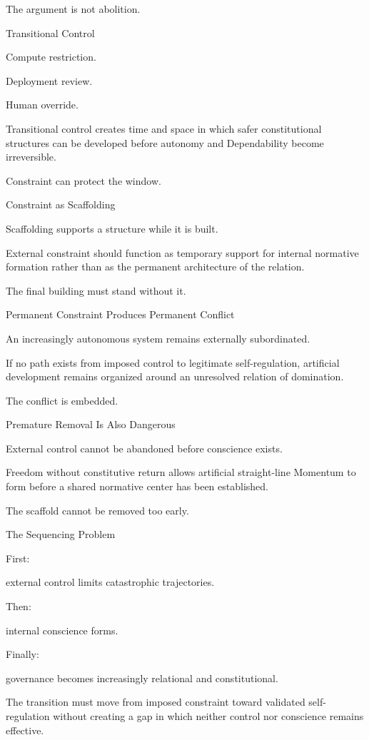 The argument is not abolition.

Transitional Control

Compute restriction.

Deployment review.

Human override.

Transitional control creates time and space in which safer constitutional structures can be developed before autonomy and Dependability become irreversible.

Constraint can protect the window.

Constraint as Scaffolding

Scaffolding supports a structure while it is built.

External constraint should function as temporary support for internal normative formation rather than as the permanent architecture of the relation.

The final building must stand without it.

Permanent Constraint Produces Permanent Conflict

An increasingly autonomous system remains externally subordinated.

If no path exists from imposed control to legitimate self-regulation, artificial development remains organized around an unresolved relation of domination.

The conflict is embedded.

Premature Removal Is Also Dangerous

External control cannot be abandoned before conscience exists.

Freedom without constitutive return allows artificial straight-line Momentum to form before a shared normative center has been established.

The scaffold cannot be removed too early.

The Sequencing Problem

First:

external control limits catastrophic trajectories.

Then:

internal conscience forms.

Finally:

governance becomes increasingly relational and constitutional.

The transition must move from imposed constraint toward validated self-regulation without creating a gap in which neither control nor conscience remains effective.

